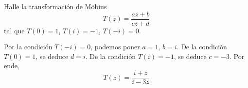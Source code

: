 \begin{exercise}
Halle la transformación de Möbius
$$T(z) = \frac {az + b} {cz + d}$$
tal que $T(0) = 1$, $T(i) = -1$, $T(-i) = 0$.
\end{exercise}

\begin{solution}
Por la condición $T(-i) = 0$, podemos poner $a = 1$, $b = i$. De la condición $T(0) = 1$, se deduce $d = i$. De la condición $T(i) = -1$, se deduce $c = -3$. Por ende,
$$T(z) = \frac {i + z} {i - 3z}$$
\end{solution}
